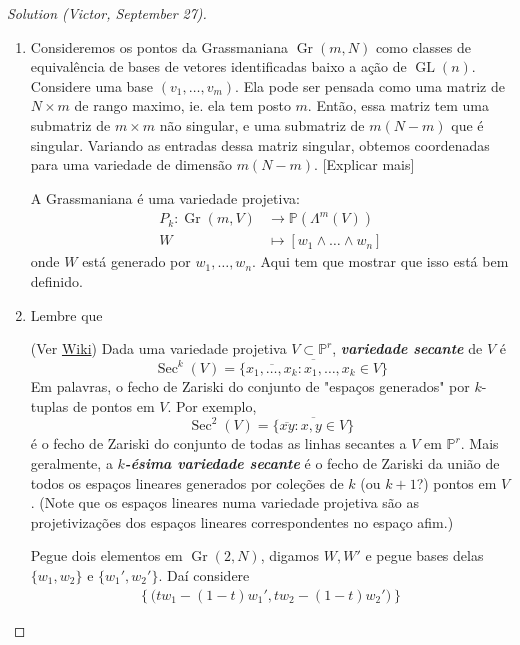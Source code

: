 \begin{proof}[Solution (Victor, September 27)]\leavevmode
	\begin{enumerate}[label=\alph*.]
		\item Consideremos os pontos da Grassmaniana $\operatorname{Gr}(m,N)$ como classes de equivalência de bases de vetores identificadas baixo a ação de $\operatorname{GL}(n)$. Considere uma base $(v_1,\ldots,v_m)$. Ela pode ser pensada como uma matriz de $N\times m$ de rango maximo, ie. ela tem posto $m$. Então, essa matriz tem uma submatriz de $m\times m$ não singular, e uma submatriz de $m(N-m)$ que  é singular. Variando as entradas dessa matriz singular, obtemos coordenadas para uma variedade de  dimensão $m(N-m)$. {\color{4}[Explicar mais]}

\begin{defn}
	A Grassmaniana é uma variedade projetiva:
	\begin{align*}
		P_k: \operatorname{Gr}(m,V) &\longrightarrow \mathbb{P}\left( \Lambda^m(V) \right)  \\
		W &\longmapsto [w_1\wedge \ldots \wedge w_n]
	\end{align*}
	onde $W$  está generado por $w_1,\ldots,w_n$. Aqui tem que mostrar que isso está bem definido.
\end{defn}

\item Lembre que
	\begin{defn}
		(Ver  \href{https://en.wikipedia.org/wiki/Secant_variety}{Wiki}) Dada uma variedade projetiva $V\subset \mathbb{P}^r$, \textit{\textbf{variedade secante}} de $V$ é
		\[\operatorname{Sec}^k(V)=\overline{\{\overline{x_1,\ldots,x_k}:x_1,\ldots,x_k\in V\}}\]
		Em palavras, o fecho de Zariski do conjunto de "espaços generados" por $k$-tuplas de pontos em $V$. Por exemplo,
		\[\operatorname{Sec}^2(V)=\overline{\{\overline{xy}:x,y\in V\}}\]
		é o fecho de Zariski do conjunto de todas as linhas secantes a $V$ em $\mathbb{P}^r$. Mais geralmente, a \textit{\textbf{$k$-ésima variedade secante}} é o fecho de Zariski da união de todos os espaços lineares generados por coleções  de $k$ (ou $k+1$?) pontos em  $V$. (Note que os espaços lineares numa variedade projetiva são as projetivizações dos espaços lineares correspondentes no espaço afim.)
	\end{defn}
Pegue dois elementos em $\operatorname{Gr}(2,N)$, digamos $W,W'$ e pegue bases delas  $\{w_1,w_2\}$ e $\{w_1',w_2'\}$. Daí considere
\begin{align*}
	 \left\{ \big(tw_1-(1-t)w_1', tw_2-(1-t)w_2'\big)\right\}
\end{align*}

	\end{enumerate}
\end{proof}

